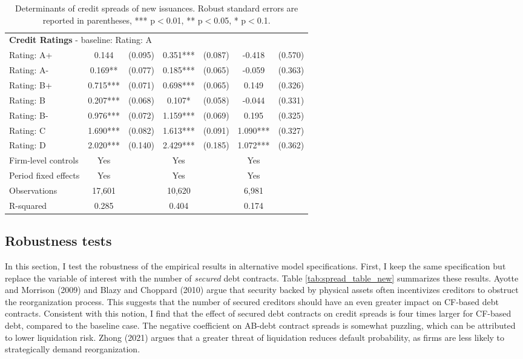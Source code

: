 \documentclass[12pt]{article}
\begin{document}
\begin{table}[H]
{\begin{tabular}{lcccccc}
    \multicolumn{7}{l}{\textbf{Credit Ratings} - baseline: Rating: A} \\
    Rating: A+ & 0.144 & (0.095) & 0.351*** & (0.087) & -0.418 & (0.570) \\
    Rating: A- &  0.169** & (0.077) & 0.185*** & (0.065) & -0.059 & (0.363) \\
    Rating: B+ & 0.715*** & (0.071) & 0.698*** & (0.065) & 0.149 & (0.326) \\
    Rating: B & 0.207*** & (0.068) & 0.107* & (0.058) & -0.044 & (0.331) \\
    Rating: B- & 0.976*** & (0.072) & 1.159*** & (0.069) & 0.195 & (0.325) \\
    Rating: C  & 1.690*** & (0.082) & 1.613*** & (0.091) & 1.090*** & (0.327) \\
    Rating: D & 2.020*** & (0.140) & 2.429*** & (0.185) & 1.072*** & (0.362) \\
    \midrule
    Firm-level controls & Yes & & Yes & & Yes & \\
    Period fixed effects & Yes & & Yes & & Yes & \\
    Observations & 17,601 & & 10,620 & & 6,981 & \\
    R-squared & 0.285 & & 0.404 & & 0.174 & \\
    \bottomrule
    \end{tabular}%
    }
    \caption{\small Determinants of credit spreads of new issuances. Robust standard errors are reported in parentheses,  *** p$<$0.01, ** p$<$0.05, * p$<$0.1.}
\end{table}

\subsection{Robustness tests \label{sec:robustness}}

In this section, I test the robustness of the empirical results in alternative model specifications. First, I keep the same specification but replace the variable of interest with the number of \textit{secured} debt contracts. Table \ref{tab:spread_table_new} summarizes these results. Ayotte and Morrison (2009) and Blazy and Choppard (2010) argue that security backed by physical assets often incentivizes creditors to obstruct the reorganization process. This suggests that the number of secured creditors should have an even greater impact on CF-based debt contracts. Consistent with this notion, I find that the effect of secured debt contracts on credit spreads is four times larger for CF-based debt, compared to the baseline case. The negative coefficient on AB-debt contract spreads is somewhat puzzling, which can be attributed to lower liquidation risk. Zhong (2021) argues that a greater threat of liquidation reduces default probability, as firms are less likely to strategically demand reorganization.
\end{document}
